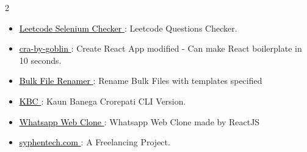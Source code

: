 \documentclass[10pt,a4paper,ragged2e,withhyper]{altacv}
\begin{document}
\begin{paracol}{2}
\vspace{5pt}
		\vspace{-5pt}
\vspace{-3pt}
	\begin{itemize}
		\item {\href{https://github.com/grawish/Leetcode_Selenium}{\textcolor{black} {\underline{Leetcode Selenium Checker} {\scriptsize \faExternalLink*}}}: Leetcode Questions Checker.}
		\item {\href{https://github.com/grawish/cra-by-goblin}{\textcolor{black} {\underline{cra-by-goblin} {\scriptsize \faExternalLink*}}}: Create React App modified - Can make React boilerplate in 10 seconds.}
		\item {\href{https://github.com/grawish/Bulk-File-Renamer-windows}{\textcolor{black} {\underline{Bulk File Renamer} {\scriptsize \faExternalLink*}}}: Rename Bulk Files with templates specified}

		\item {\href{https://github.com/grawish/kbc}{\textcolor{black} {\underline{KBC} {\scriptsize \faExternalLink*}}}: Kaun Banega Crorepati CLI Version.}
		\item {\href{https://github.com/grawish/whatsapp-web-clone}{\textcolor{black} {\underline{Whatsapp Web Clone} {\scriptsize \faExternalLink*}}}: Whatsapp Web Clone made by ReactJS}
		\item {\href{https://github.com/grawish/Syphen_Website_frontend}{\textcolor{black} {\underline{syphentech.com} {\scriptsize \faExternalLink*}}}: A Freelancing Project.}


\end{itemize}
\end{paracol}
\end{document}
